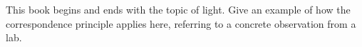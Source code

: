 This book begins and ends with the topic of light. Give an example
of how the correspondence principle applies here, referring to
a concrete observation from a lab.

